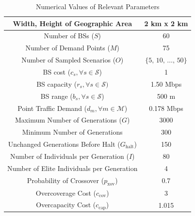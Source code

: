 \documentclass[conference]{IEEEtran}
\begin{document}
\begin{table}
\vspace{0.1in}
\centering
\caption{Numerical Values of Relevant Parameters}
\begin{tabular}{|c|c|} 
\hline
Width, Height of Geographic Area & 2 km x 2 km \\
\hline
Number of BSs ($S$) & 60 \\ 
\hline 
Number of Demand Points ($M$) & 75 \\ 
\hline 
Number of Sampled Scenarios ($O$) & $\{5,\, 10,\, \ldots,\, 50\}$ \\ 
\hline 
BS cost ($c_s, \forall s \in \mathcal{S}$) & 1 \\ 
\hline 
BS capacity ($r_s, \forall s \in \mathcal{S})$ & 1.50 Mbps \\ 
\hline
BS range ($b_s, \forall s \in \mathcal{S}$) & 500 m \\
\hline 
Point Traffic Demand ($d_m, \forall m \in \mathcal{M}$) & 0.178 Mbps \\ 
\hline
Maximum Number of Generations ($G$) & 3000 \\ 
\hline
Minimum Number of Generations & 300 \\
\hline
Unchanged Generations Before Halt ($G_\text{halt}$) & 150 \\
\hline 
Number of Individuals per Generation ($I$) & 80 \\ 
\hline
Number of Elite Individuals per Generation & 4 \\
\hline 
Probability of Crossover ($p_\text{xov}$) & 0.7 \\ 
\hline 
Overcoverage Cost ($c_\text{cov}$) & 3 \\
\hline
Overcapacity Cost ($c_\text{cap}$) & 1.015 \\
\hline
\end{tabular}
\label{tab:simval}
\end{table}
\end{document}
